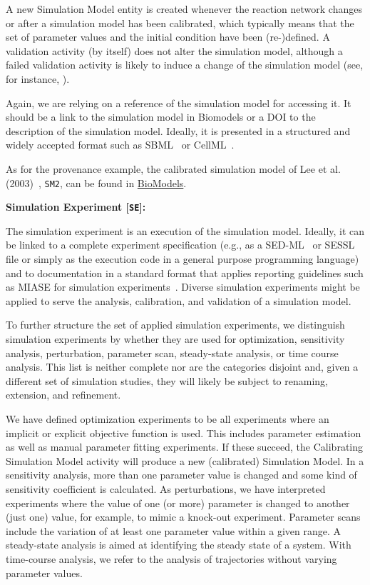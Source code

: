 \documentclass[10pt,letterpaper]{article}
\newcommand{\lee}{Lee et al. (2003)}
\newcommand{\SM}{Simulation Model}
\newcommand{\SE}{Simulation Experiment}
\newcommand{\CSM}{Calibrating Simulation Model}
\begin{document}
A new \SM{} entity is created whenever the reaction network changes or after a simulation model has been calibrated, which typically means that the set of parameter values and the initial condition have been (re-)defined.
A validation activity (by itself) does not alter the simulation model, although a failed validation activity is likely to induce a change of the simulation model (see, for instance, \cite{Haack2020}).

Again, we are relying on a reference of the simulation model for accessing it.
It should be a link to the simulation model in Biomodels or a DOI to the description of the simulation model.
Ideally, it is presented in a structured and widely accepted format such as SBML~\cite{Hucka2003} or CellML~\cite{Lloyd2004}.

As for the provenance example, the calibrated simulation model of \lee{}~\cite{Lee2003}, \texttt{SM2}, can be found in \href{https://www.ebi.ac.uk/biomodels/BIOMD0000000658}{BioModels}.


\textbf{\SE{} [\texttt{SE}]:}

\noindent The simulation experiment is an execution of the simulation model.
Ideally, it can be linked to a complete experiment specification (e.g., as a SED-ML~\cite{Koehn2008} or SESSL~\cite{Ewald2014} file or simply as the execution code in a general purpose programming language) and to documentation in a standard format that applies reporting guidelines such as MIASE for simulation experiments~\cite{Waltemath2011}.
Diverse simulation experiments might be applied to serve the analysis, calibration, and validation of a simulation model.

To further structure the set of applied simulation experiments, we distinguish simulation experiments by whether they are used for optimization, sensitivity analysis, perturbation, parameter scan, steady-state analysis, or time course analysis.
This list is neither complete nor are the categories disjoint and, given a different set of simulation studies, they will likely be subject to renaming, extension, and refinement.

We have defined optimization experiments to be all experiments where an implicit or explicit objective function is used.
This includes parameter estimation as well as manual parameter fitting experiments.
If these succeed, the \CSM{} activity will produce a new (calibrated) \SM{}.
In a sensitivity analysis, more than one parameter value is changed and some kind of sensitivity coefficient is calculated.
As perturbations, we have interpreted experiments where the value of one (or more) parameter is changed to another (just one) value, for example, to mimic a knock-out experiment.
Parameter scans include the variation of at least one parameter value within a given range.
A steady-state analysis is aimed at identifying the steady state of a system.
With time-course analysis, we refer to the analysis of trajectories without varying parameter values.
\end{document}
